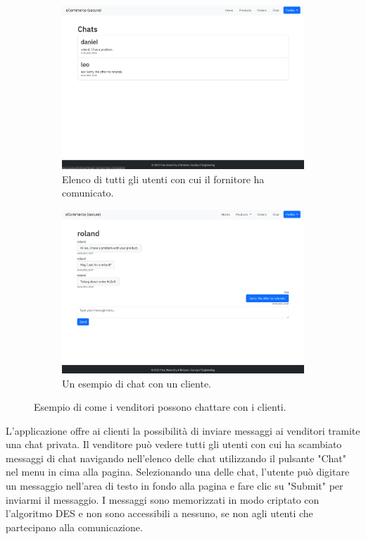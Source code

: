 \documentclass[conference,onecolumn,a4paper]{IEEEtran}
\begin{document}
\begin{figure}[H]
    \centering
    \begin{subfigure}[b]{0.4\linewidth}
        \includegraphics[width=\linewidth]{resources/chat-list.png}
        \caption{Elenco di tutti gli utenti con cui il fornitore ha comunicato.}
    \end{subfigure}
    \begin{subfigure}[b]{0.4\linewidth}
        \includegraphics[width=\linewidth]{resources/chat.png}
        \caption{Un esempio di chat con un cliente.}
    \end{subfigure}
    \caption{Esempio di come i venditori possono chattare con i clienti.}
\end{figure}

L'applicazione offre ai clienti la possibilità di inviare messaggi ai venditori tramite una chat privata. Il venditore può vedere tutti gli utenti con cui ha scambiato messaggi di chat navigando nell'elenco delle chat utilizzando il pulsante "Chat" nel menu in cima alla pagina. Selezionando una delle chat, l'utente può digitare un messaggio nell'area di testo in fondo alla pagina e fare clic su "Submit" per inviarmi il messaggio. I messaggi sono memorizzati in modo criptato con l'algoritmo DES e non sono accessibili a nessuno, se non agli utenti che partecipano alla comunicazione.
\end{document}
